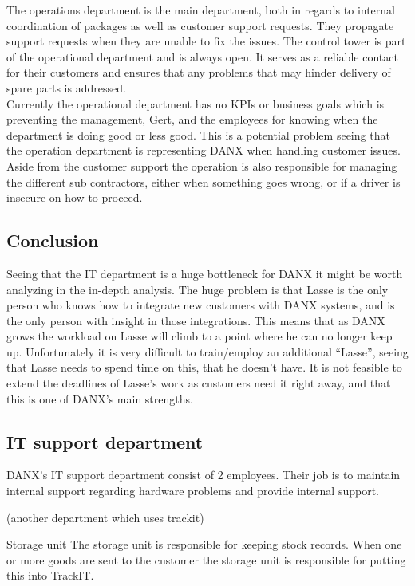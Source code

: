 The operations department is the main department, both in regards to internal coordination of packages as well as customer support requests. They propagate support requests when they are unable to fix the issues. 
The control tower is part of the operational department and is always open. It serves as a reliable contact for their customers and ensures that any problems that may hinder delivery of spare parts is addressed. \\

Currently the operational department has no KPIs or business goals which is preventing the management, Gert, and the employees for knowing when the department is doing good or less good. This is a potential problem seeing that the operation department is representing DANX when handling customer issues. \\

Aside from the customer support the operation is also responsible for managing the different sub contractors, either when something goes wrong, or if a driver is insecure on how to proceed. 


\subsection{Conclusion}
Seeing that the IT department is a huge bottleneck for DANX it might be worth analyzing in the in-depth analysis. The huge problem is that Lasse is the only person who knows how to integrate new customers with DANX systems, and is the only person with insight in those integrations. This means that as DANX grows the workload on Lasse will climb to a point where he can no longer keep up.
Unfortunately it is very difficult to train/employ an additional “Lasse”, seeing that Lasse needs to spend time on this, that he doesn’t have. It is not feasible to extend the deadlines of Lasse’s work as customers need it right away, and that this is one of DANX’s main strengths. 

\subsection{IT support department}
DANX’s IT support department consist of 2 employees. Their job is to maintain internal support regarding hardware problems and provide internal support.



(another department which uses trackit)

Storage unit
The storage unit is responsible for keeping stock records. When one or more goods are sent to the customer the storage unit is responsible for putting this into TrackIT.
\\
